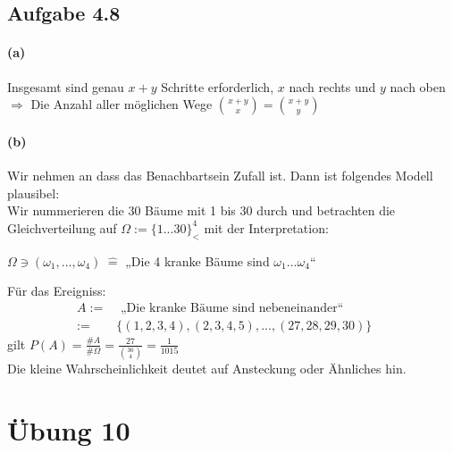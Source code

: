 \documentclass[10pt, a4paper]{article}
\begin{document}
\subsection{Aufgabe 4.8}
\paragraph*{(a)}
Insgesamt sind genau $x+y$ Schritte erforderlich, $x$ nach rechts und $y$ nach oben\vspace{5pt}	\\
$\Rightarrow$ Die Anzahl aller möglichen Wege $\binom{x+y}{x}=\binom{x+y}{y}$


\paragraph*{(b)}
Wir nehmen an dass das Benachbartsein Zufall ist. Dann ist folgendes Modell plausibel:	\\
Wir nummerieren die 30 Bäume mit 1 bis 30 durch und betrachten die Gleichverteilung auf $\Omega:=\{1...30\}_{<}^{4}$ mit der Interpretation:
\begin{center}
	$\Omega\ni(\omega_{1},...,\omega_{4})\hspace{3pt}\widehat{=}$  „Die 4 kranke Bäume sind $\omega_{1}...\omega_{4}$“
\end{center}
Für das Ereigniss:
\begin{align*}
	A:=&\text{ „Die kranke Bäume sind nebeneinander“}~~~~~~~~~~~~~~~~	\\
	:=&\{(1,2,3,4),(2,3,4,5),...,(27,28,29,30)\}
\end{align*}
gilt $P(A)=\frac{\#A}{\#\Omega}=\frac{27}{\binom{30}{4}}=\frac{1}{1015}$ \\
Die kleine Wahrscheinlichkeit deutet auf Ansteckung oder Ähnliches hin.



\section{Übung 10}
\end{document}
